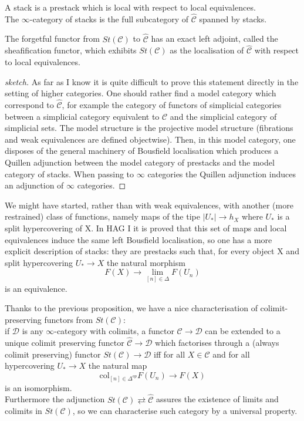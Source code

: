 \begin{defin}
A stack is a prestack which is local with respect to local equivalences.\\
The $\infty$-category of stacks is the full subcategory of $\hat{\mathcal C}$ spanned by stacks. 
\end{defin}

\begin{prop}[{\citehigherstacks{tv}}]
The forgetful functor from $St(\mathcal C)$ to $\hat{\mathcal C}$ has an exact left adjoint, called the sheafification functor, which exhibits $St(\mathcal C)$ as the localisation of $\hat{\mathcal C}$
with respect to local equivalences. 
\end{prop}

\begin{proof} [sketch]
As far as I know it is quite difficult to prove this statement directly in the setting of higher categories. One should rather find a model category which correspond to
$\hat{\mathcal C}$, for example the category of functors of simplicial categories between a simplicial category equivalent to $\mathcal C$ and the simplicial category of simplicial sets.
The model structure is the projective model structure (fibrations and weak equivalences are defined objectwise). Then, in this model category, one disposes of the general
machinery of Bousfield localisation which produces a Quillen adjunction between the model category of prestacks and the model category of stacks. When passing to $\infty$
categories the Quillen adjunction induces an adjunction of $\infty$
categories.
\end{proof}

\begin{prop}
We might have started, rather than with weak equivalences, with another (more restrained) class of functions, namely maps of the tipe $|U_*|\to h_X$ where $U_*$ is a split
hypercovering of X. In HAG I it is proved that this set of maps and local equivalences induce the same left Bousfield localisation, so one has a more explicit description
of stacks: they are prestacks such that, for every object X and split hypercovering $U_*\to X$ the natural morphism
$$F(X)\to\lim_{[n]\in\Delta} F(U_n)$$
is an equivalence.
\end{prop}

\begin{rmk}
Thanks to the previous proposition, we have a nice characterisation of colimit-preserving functors from $St(\mathcal C)$:\\
if $\mathcal{D}$ is any $\infty$-category with colimits, a functor $\mathcal C\to\mathcal{D}$ can be extended to a unique colimit preserving functor $\hat{\mathcal C}\to\mathcal{D}$ which
factorises through a (always colimit preserving) functor $St(\mathcal C)\to \mathcal{D}$ iff for all $X\in\mathcal C$ and for all hypercovering $U_*\to X$ the natural map
$$\mathrm{col}_{[n]\in\Delta^{op}} F(U_n)\to F(X)$$
is an isomorphism.\\
Furthermore the adjunction $St(\mathcal C)\rightleftarrows \hat{\mathcal C}$ assures the existence of limits and colimits in $St(\mathcal C)$, so we can characterise such category by a
universal property.
\end{rmk}


